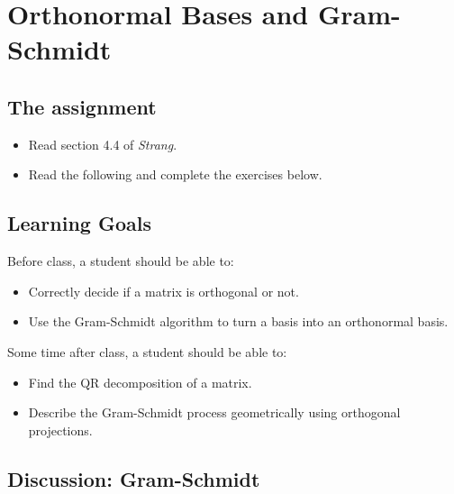 \documentclass[10pt,]{book}
\theoremstyle{plain}
\theoremstyle{definition}
\numberwithin{equation}{section}
\begin{document}
\section[Orthonormal Bases and Gram-Schmidt]{Orthonormal Bases and Gram-Schmidt}\label{section-gram-schmidt}
\typeout{************************************************}
\typeout{************************************************}
\subsection[The assignment]{The assignment}\label{subsection-108}
\begin{itemize}
\item{}Read section 4.4 of \emph{Strang}.\item{}Read the following and complete the exercises below.\end{itemize}
\typeout{************************************************}
\typeout{************************************************}
\subsection[Learning Goals]{Learning Goals}\label{subsection-109}
Before class, a student should be able to:%
\begin{itemize}
\item{}Correctly decide if a matrix is orthogonal or not.\item{}
        Use the Gram-Schmidt algorithm to turn a basis into an
        orthonormal basis.
      \end{itemize}
\par
Some time after class, a student should be able to:%
\begin{itemize}
\item{}Find the QR decomposition of a matrix.\item{}Describe the Gram-Schmidt process geometrically using orthogonal
        projections.
      \end{itemize}
\typeout{************************************************}
\typeout{************************************************}
\subsection[Discussion: Gram-Schmidt]{Discussion: Gram-Schmidt}\label{subsection-110}
\end{document}
